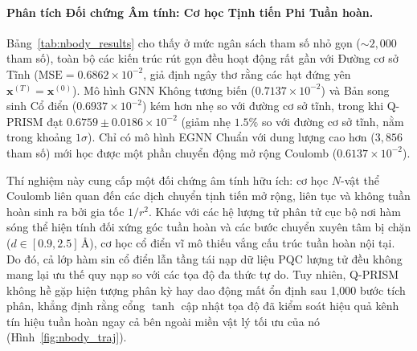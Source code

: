 \documentclass[10pt,twocolumn,letterpaper]{article}
\begin{document}
\begin{table}[h]
\centering
\small
\setlength{\tabcolsep}{4pt}
\caption{\textbf{Dự báo Quỹ đạo Hệ N-Vật thể Tích điện 3D} ($N=1{,}000$, Trung bình $\pm$ Độ lệch chuẩn trên 5 Hạt giống: $42, 43, 44, 45, 46$).}
\label{tab:nbody_results}
\end{table}

\paragraph{Phân tích Đối chứng Âm tính: Cơ học Tịnh tiến Phi Tuần hoàn.}
Bảng~\ref{tab:nbody_results} cho thấy ở mức ngân sách tham số nhỏ gọn ($\sim 2{,}000$ tham số), toàn bộ các kiến trúc rút gọn đều hoạt động rất gần với Đường cơ sở Tĩnh ($\text{MSE} = 0.6862 \times 10^{-2}$, giả định ngây thơ rằng các hạt đứng yên $\mathbf{x}^{(T)} = \mathbf{x}^{(0)}$). Mô hình GNN Không tương biến ($0.7137 \times 10^{-2}$) và Bản song sinh Cổ điển ($0.6937 \times 10^{-2}$) kém hơn nhẹ so với đường cơ sở tĩnh, trong khi Q-PRISM đạt $0.6759 \pm 0.0186 \times 10^{-2}$ (giảm nhẹ $1.5\%$ so với đường cơ sở tĩnh, nằm trong khoảng $1\sigma$). Chỉ có mô hình EGNN Chuẩn với dung lượng cao hơn ($3{,}856$ tham số) mới học được một phần chuyển động mở rộng Coulomb ($0.6137 \times 10^{-2}$).

Thí nghiệm này cung cấp một đối chứng âm tính hữu ích: cơ học $N$-vật thể Coulomb liên quan đến các dịch chuyển tịnh tiến mở rộng, liên tục và không tuần hoàn sinh ra bởi gia tốc $1/r^2$. Khác với các hệ lượng tử phân tử cục bộ nơi hàm sóng thể hiện tính đối xứng góc tuần hoàn và các bước chuyển xuyên tâm bị chặn ($d \in [0.9, 2.5]$\,\AA), cơ học cổ điển vĩ mô thiếu vắng cấu trúc tuần hoàn nội tại. Do đó, cả lớp hàm sin cổ điển lẫn tầng tái nạp dữ liệu PQC lượng tử đều không mang lại ưu thế quy nạp so với các tọa độ đa thức tự do. Tuy nhiên, Q-PRISM không hề gặp hiện tượng phân kỳ hay dao động mất ổn định sau 1{,}000 bước tích phân, khẳng định rằng cổng $\tanh$ cập nhật tọa độ đã kiểm soát hiệu quả kênh tín hiệu tuần hoàn ngay cả bên ngoài miền vật lý tối ưu của nó (Hình~\ref{fig:nbody_traj}).
\end{document}
